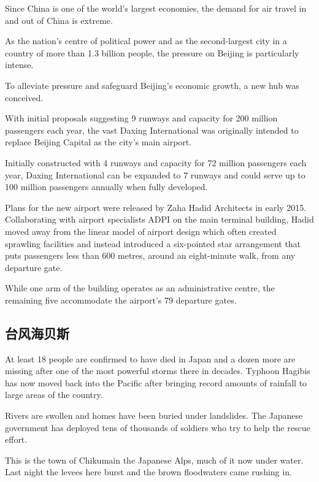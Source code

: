 Since China is one of the world's largest economies, the demand for air travel in and out
of China is extreme.

As the nation's centre of political power and as the second-largest city in a country of more than 1.3 billion people, the pressure on Beijing is particularly intense.

To alleviate pressure and safeguard Beijing's economic growth, a new hub was conceived.

With initial proposals suggesting 9 runways and capacity for 200 million passengers each year, the vast Daxing International was originally intended to replace Beijing Capital as the city's main airport.

Initially constructed with 4 runways and capacity for 72 million passengers each year, Daxing International can be expanded to 7 runways and could serve up to 100 million passengers annually when fully developed.

Plans for the new airport were released by Zaha Hadid Architects in early 2015. Collaborating with airport specialists ADPI on the main terminal building, Hadid moved away from the linear model of airport design which often created sprawling facilities and instead introduced a six-pointed star arrangement that puts passengers less than 600 metres, around an eight-minute walk, from any departure gate.

While one arm of the building operates as an administrative centre, the remaining five accommodate the airport's 79 departure gates.
\subsection{台风海贝斯}
At least 18 people are confirmed to have died in Japan and a dozen more are missing after one of the most powerful storms there in decades. Typhoon Hagibis has now moved back into the Pacific after bringing record amounts of rainfall to large areas of the country.

Rivers are swollen and homes have been buried under landslides. The Japanese government has deployed tens of thousands of soldiers who try to help the rescue effort.

This is the town of Chikumain the Japanese Alps, much of it now under water. Last night the levees here burst and the brown floodwaters came rushing in.

